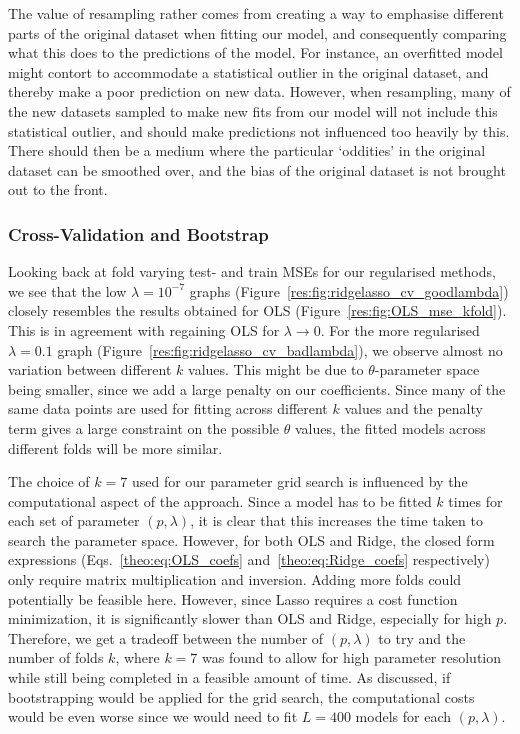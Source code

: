 \documentclass[twocolumn,english,notitlepage]{article}
\begin{document}
        The value of resampling rather comes from creating a way to emphasise different parts of the original dataset when fitting our model, and consequently comparing what this does to the predictions of the model. For instance, an overfitted model might contort to accommodate a statistical outlier in the original dataset, and thereby make a poor prediction on new data. However, when resampling, many of the new datasets sampled to make new fits from our model will not include this statistical outlier, and should make predictions not influenced too heavily by this. There should then be a medium where the particular `oddities' in the original dataset can be smoothed over, and the bias of the original dataset is not brought out to the front.

        \subsubsection{Cross-Validation and Bootstrap} 
            Looking back at fold varying test- and train MSEs for our regularised methods, we see that the low $\lambda = 10^{-7}$ graphs (Figure~\ref{res:fig:ridgelasso_cv_goodlambda}) closely resembles the results obtained for OLS (Figure~\ref{res:fig:OLS_mse_kfold}). This is in agreement with regaining OLS for $\lambda \xrightarrow{} 0$. For the more regularised $\lambda = 0.1$ graph (Figure~\ref{res:fig:ridgelasso_cv_badlambda}), we observe almost no variation between different $k$ values. This might be due to $\theta$-parameter space being smaller, since we add a large penalty on our coefficients. Since many of the same data points are used for fitting across different $k$ values and the penalty term gives a large constraint on the possible $\theta$ values, the fitted models across different folds will be more similar.  
        
            The choice of $k=7$ used for our parameter grid search is influenced by the computational aspect of the approach. Since a model has to be fitted $k$ times for each set of parameter $(p,\lambda)$, it is clear that this increases the time taken to search the parameter space. However, for both OLS and Ridge, the closed form expressions (Eqs.~\eqref{theo:eq:OLS_coefs} and~\eqref{theo:eq:Ridge_coefs} respectively) only require matrix multiplication and inversion. Adding more folds could potentially be feasible here. However, since Lasso requires a cost function minimization, it is significantly slower than OLS and Ridge, especially for high $p$. Therefore, we get a tradeoff between the number of $(p,\lambda)$ to try and the number of folds $k$, where $k=7$ was found to allow for high parameter resolution while still being completed in a feasible amount of time. As discussed, if bootstrapping would be applied for the grid search, the computational costs would be even worse since we would need to fit $L = 400$ models for each $(p,\lambda)$.  
\end{document}
